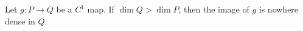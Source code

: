 Let $g: P \to Q$ be a $C^1$ map. If $\dim Q > \dim P$, then the image of $g$ is nowhere dense in $Q$.
